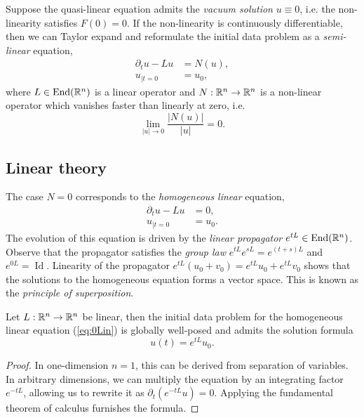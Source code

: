 
Suppose the quasi-linear equation admits the \textit{vacuum solution} $u \equiv 0$, i.e. the non-linearity satisfies $F(0) = 0$. If the non-linearity is continuously differentiable, then we can Taylor expand and reformulate the initial data problem as a \emph{semi-linear} equation, 
	\begin{equation}
		\begin{split}
			\partial_t u - Lu 
				&= N(u), \\
			u_{|t = 0}
				&= u_0,	
		\end{split}
		\tag{sLin}
		\label{eq:sLin}
	\end{equation}
where $L \in \operatorname{End} (\mathbb R^n)$ is a linear operator and $N: \mathbb R^n \to \mathbb R^n$ is a non-linear operator which vanishes faster than linearly at zero, i.e.
	\[ \lim_{|u| \to 0} \frac{|N(u)|}{|u|} = 0. \]	
	
\subsection{Linear theory}
The case $N = 0$ corresponds to the \emph{homogeneous linear} equation,
	\begin{equation}
		\begin{split}
			\partial_t u - Lu 
				&= 0, \\
			u_{|t = 0}
				&= u_0.
		\end{split}
		\tag{0Lin}
		\label{eq:0Lin}
	\end{equation}
The evolution of this equation is driven by the \emph{linear propagator} $e^{tL} \in \operatorname{End} (\mathbb R^n)$. Observe that the propagator satisfies the \textit{group law} $e^{tL} e^{sL} = e^{(t + s) L}$ and $e^{0L} = \operatorname{Id}$. Linearity of the propagator $e^{tL} (u_0 + v_0) = e^{tL} u_0 + e^{tL} v_0$ shows that the solutions to the homogeneous equation forms a vector space. This is known as the \emph{principle of superposition}.
	
\begin{theorem}
	Let $L : \mathbb R^n \to \mathbb R^n$ be linear, then the initial data problem for the homogeneous linear equation (\ref{eq:0Lin}) is globally well-posed and admits the solution formula
		\[ u(t) = e^{tL} u_0. \]
\end{theorem}

\begin{proof}
	In one-dimension $n = 1$, this can be derived from separation of variables. In arbitrary dimensions, we can multiply the equation by an integrating factor $e^{-tL}$, allowing us to rewrite it as $\partial_t (e^{-tL} u) = 0$. Applying the fundamental theorem of calculus furnishes the formula.
\end{proof}

